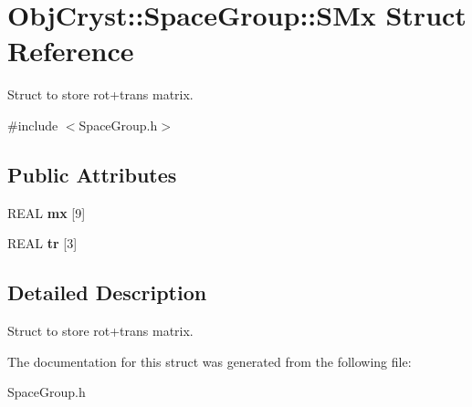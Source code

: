 \hypertarget{struct_obj_cryst_1_1_space_group_1_1_s_mx}{}\section{Obj\+Cryst\+::Space\+Group\+::S\+Mx Struct Reference}
\label{struct_obj_cryst_1_1_space_group_1_1_s_mx}


Struct to store rot+trans matrix.  




{\ttfamily \#include $<$Space\+Group.\+h$>$}

\subsection*{Public Attributes}
\begin{DoxyCompactItemize}
\item 
\mbox{\label{struct_obj_cryst_1_1_space_group_1_1_s_mx_af1033aa35c50c8e536d1e656358b3580}} 
R\+E\+AL {\bfseries mx} \mbox{[}9\mbox{]}
\item 
\mbox{\label{struct_obj_cryst_1_1_space_group_1_1_s_mx_a1565a138ebe46589c74671c7037af97b}} 
R\+E\+AL {\bfseries tr} \mbox{[}3\mbox{]}
\end{DoxyCompactItemize}


\subsection{Detailed Description}
Struct to store rot+trans matrix. 

The documentation for this struct was generated from the following file\+:\begin{DoxyCompactItemize}
\item 
Space\+Group.\+h\end{DoxyCompactItemize}
